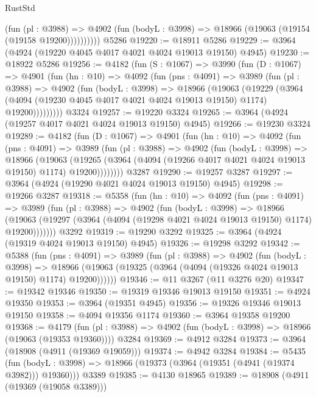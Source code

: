 \begin{lexlean}{RustStd}
\begin{coremodule}
              (fun (pl : @3988) =>
              @4902 (fun (bodyL : @3998) => @18966 (@19063 (@19154 (@19158 @19200))))))))))
    @5286
@19220 := @18911 @5286
@19229 := @3964 (@4924 (@19220 @4045 @4017 @4021 @4024 @19013 @19150) @4945)
@19230 := @18922 @5286
@19256 := @4182
    (fun (S : @1067) =>
    @3990
      (fun (D : @1067) =>
      @4901
        (fun (hn : @10) =>
        @4092
          (fun (pns : @4091) =>
          @3989
            (fun (pl : @3988) =>
            @4902
              (fun (bodyL : @3998) =>
              @18966
                (@19063
                  (@19229
                    (@3964
                      (@4094 (@19230 @4045 @4017 @4021 @4024 @19013 @19150) @1174)
                      @19200)))))))))
    @3324
@19257 := @19220 @3324
@19265 := @3964 (@4924 (@19257 @4017 @4021 @4024 @19013 @19150) @4945)
@19266 := @19230 @3324
@19289 := @4182
    (fun (D : @1067) =>
    @4901
      (fun (hn : @10) =>
      @4092
        (fun (pns : @4091) =>
        @3989
          (fun (pl : @3988) =>
          @4902
            (fun (bodyL : @3998) =>
            @18966
              (@19063
                (@19265 (@3964 (@4094 (@19266 @4017 @4021 @4024 @19013 @19150) @1174) @19200))))))))
    @3287
@19290 := @19257 @3287
@19297 := @3964 (@4924 (@19290 @4021 @4024 @19013 @19150) @4945)
@19298 := @19266 @3287
@19318 := @5358
    (fun (hn : @10) =>
    @4092
      (fun (pns : @4091) =>
      @3989
        (fun (pl : @3988) =>
        @4902
          (fun (bodyL : @3998) =>
          @18966
            (@19063 (@19297 (@3964 (@4094 (@19298 @4021 @4024 @19013 @19150) @1174) @19200)))))))
    @3292
@19319 := @19290 @3292
@19325 := @3964 (@4924 (@19319 @4024 @19013 @19150) @4945)
@19326 := @19298 @3292
@19342 := @5388
    (fun (pns : @4091) =>
    @3989
      (fun (pl : @3988) =>
      @4902
        (fun (bodyL : @3998) =>
        @18966 (@19063 (@19325 (@3964 (@4094 (@19326 @4024 @19013 @19150) @1174) @19200))))))
@19346 := @11 @3267 (@11 @3276 @20)
@19347 := @19342 @19346
@19350 := @19319 @19346 @19013 @19150
@19351 := @4924 @19350
@19353 := @3964 (@19351 @4945)
@19356 := @19326 @19346 @19013 @19150
@19358 := @4094 @19356 @1174
@19360 := @3964 @19358 @19200
@19368 := @4179
    (fun (pl : @3988) => @4902 (fun (bodyL : @3998) => @18966 (@19063 (@19353 @19360))))
    @3284
@19369 := @4912 @3284
@19373 := @3964 (@18908 (@4911 (@19369 @19059)))
@19374 := @4942 @3284
@19384 := @5435
    (fun (bodyL : @3998) => @18966 (@19373 (@3964 (@19351 (@4941 (@19374 @3982))) @19360)))
    @3389
@19385 := @4130 @18965
@19389 := @18908 (@4911 (@19369 (@19058 @3389)))

\end{coremodule}
\end{lexlean}
